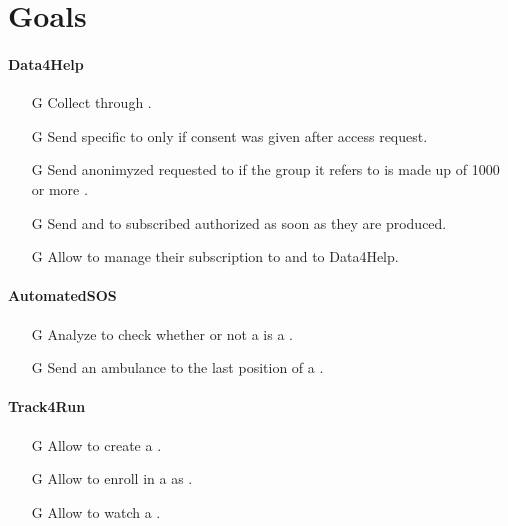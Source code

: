 \documentclass[../../rasd.tex]{subfiles}
\begin{document}
\section{Goals\label{sect:1.3}}

\paragraph{Data4Help}
\begin{itemize}
	
	\item[G\subs{1}]Collect  through .
	
	\item[G\subs{2}]Send specific  to  only if  consent was given after access request.
	\item[G\subs{3}]Send anonimyzed requested  to  if the group it refers to is made up of 1000 or more .

	\item[G\subs{4}]Send  and  to subscribed authorized  as soon as they are produced.
	
	\item[G\subs{5}]Allow  to manage their subscription to  and to Data4Help.		
	
\end{itemize}

\paragraph{AutomatedSOS}
\begin{itemize}
	\item[G\subs{6}]Analyze  to check whether or not a  is a .
	\item[G\subs{7}]Send an ambulance to the last position of a .
\end{itemize}

\paragraph{Track4Run}
\begin{itemize}
	\item[G\subs{8}]Allow  to create a .
	\item[G\subs{9}]Allow  to enroll in a  as . 
	\item[G\subs{10}]Allow  to watch a .
\end{itemize}
\end{document}
